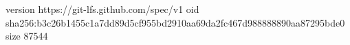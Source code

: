 version https://git-lfs.github.com/spec/v1
oid sha256:b3c26b1455c1a7dd89d5cf955bd2910aa69da2fc467d988888890aa87295bde0
size 87544
